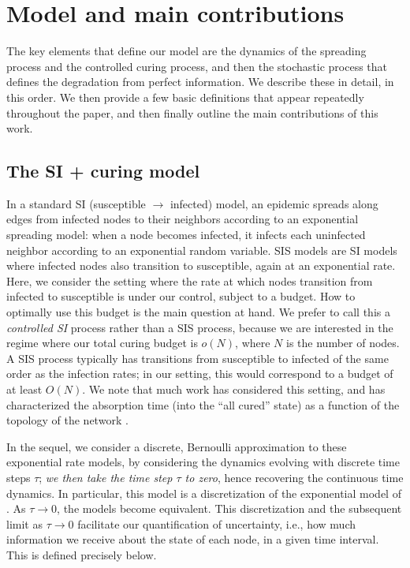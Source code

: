 \section{Model and main contributions}
The key elements that define our model are the dynamics of the spreading process and the controlled curing process, and then the stochastic process that defines the degradation from perfect information. We describe these in detail, in this order. We then provide a few basic definitions that appear repeatedly throughout the paper, and then finally outline the main contributions of this work. 

\subsection{The SI + curing model}
\label{model}
In a standard SI (susceptible $\rightarrow$ infected) model, an epidemic spreads along edges from infected nodes to their neighbors according to an exponential spreading model: when a node becomes infected, it infects each uninfected neighbor according to an exponential random variable. SIS models are SI models where infected nodes also transition to susceptible, again at an exponential rate. Here, we consider the setting where the rate at which nodes transition from infected to susceptible is under our control, subject to a budget. How to optimally use this budget is the main question at hand. We prefer to call this a {\em controlled SI} process rather than a SIS process, because we are interested in the regime where our total curing budget is $o(N)$, where $N$ is the number of nodes. A SIS process typically has transitions from susceptible to infected of the same order as the infection rates; in our setting, this would correspond to a budget of at least $O(N)$. We note that much work has considered this setting, and has characterized the absorption time (into the ``all cured'' state) as a function of the topology of the network \cite{ganesh2005effect}.

In the sequel, we consider a discrete, Bernoulli approximation to these exponential rate models, by considering the dynamics evolving with discrete time steps $\tau$; {\em we then take the time step $\tau$ to zero}, hence recovering the continuous time dynamics. In particular, this model is a discretization of the exponential model of \cite{Drakopoulos2015a}. As $\tau \to 0$, the models become equivalent. This discretization and the subsequent limit as $\tau \rightarrow 0$ facilitate our quantification of uncertainty, i.e., how much information we receive about the state of each node, in a given time interval. This is defined precisely below.


